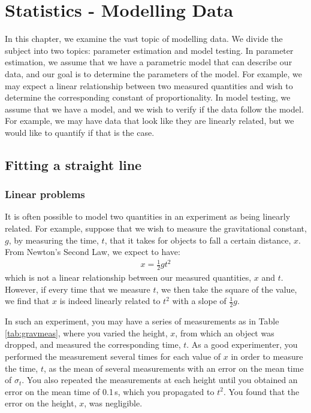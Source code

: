 \chapter{Statistics - Modelling Data}
\label{Chap:statModelData}
In this chapter, we examine the vast topic of modelling data. We divide the subject into two topics: parameter estimation and model testing. In parameter estimation, we assume that we have a parametric model that can describe our data, and our goal is to determine the parameters of the model. For example, we may expect a linear relationship between two measured quantities and wish to determine the corresponding constant of proportionality. In model testing, we assume that we have a model, and we wish to verify if the data follow the model. For example, we may have data that look like they are linearly related, but we would like to quantify if that is the case.
 

\section{Fitting a straight line}
\subsection{Linear problems}
It is often possible to model two quantities in an experiment as being linearly related. For example, suppose that we wish to measure the gravitational constant, $g$, by measuring the time, $t$, that it takes for objects to fall a certain distance, $x$. From Newton's Second Law, we expect to have:
\begin{align}
x = \frac{1}{2}gt^2
\end{align}
which is not a linear relationship between our measured quantities, $x$ and $t$. However, if every time that we measure $t$, we then take the square of the value, we find that $x$ is indeed linearly related to $t^2$ with a slope of $\frac{1}{2}g$. 

In such an experiment, you may have a series of measurements as in Table \ref{tab:gravmeas}, where you varied the height, $x$, from which an object was dropped, and measured the corresponding time, $t$. As a good experimenter, you performed the measurement several times for each value of $x$ in order to measure the time, $t$, as the mean of several measurements with an error on the mean time of $\sigma_t$. You also repeated the measurements at each height until you obtained an error on the mean time of 0.1\,s, which you propagated to $t^2$. You found that the error on the height, $x$, was negligible. 

